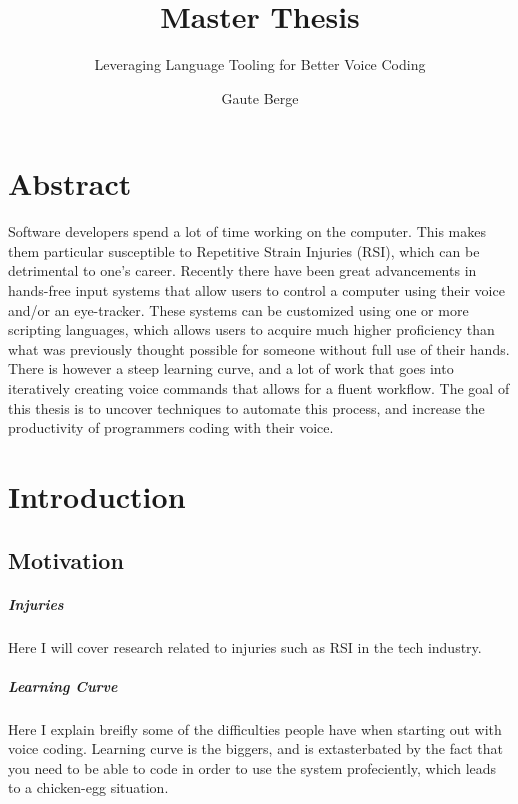 \documentclass[a4paper,english]{ifimaster}
\title{Master Thesis}
\subtitle{Leveraging Language Tooling for Better Voice Coding}
\author{Gaute Berge}
\begin{document}
\duoforside[dept={Department of Informatics},
program={Informatics: Programming and System Architecture},
long]

\frontmatter{}
\chapter*{Abstract}
Software developers spend a lot of time working on the computer.
This makes them particular susceptible to Repetitive Strain Injuries (RSI), which can be detrimental to one's career.
Recently there have been great advancements in hands-free input systems that allow users to control a computer using their voice and/or an eye-tracker.
These systems can be customized using one or more scripting languages, which allows users to acquire much higher proficiency than what was previously thought possible for someone without full use of their hands.
There is however a steep learning curve, and a lot of work that goes into iteratively creating voice commands that allows for a fluent workflow.
The goal of this thesis is to uncover techniques to automate this process, and increase the productivity of programmers coding with their voice.

\tableofcontents{}
\listoffigures{}
\listoftables{}


\mainmatter{}

\chapter{Introduction}

\section{Motivation}
\paragraph{Injuries}
Here I will cover research related to injuries such as RSI in the tech industry.
\paragraph{Learning Curve}
Here I explain breifly some of the difficulties people have when starting out with voice coding.
Learning curve is the biggers, and is extasterbated by the fact that you need
to be able to code in order to use the system profeciently, which leads to a 
chicken-egg situation.
\end{document}
